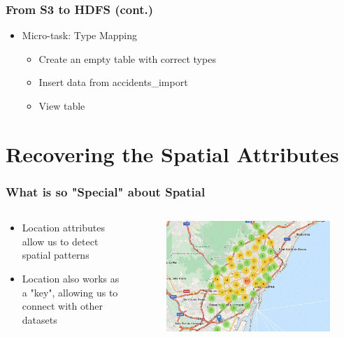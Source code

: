 \documentclass[hyperref={pdfpagelabels=true}]{beamer}
\begin{document}
\begin{frame}
\frametitle{From S3 to HDFS (cont.)}
\begin{itemize}
  \item<1->Micro-task: Type Mapping
  \begin{itemize}
    \item<2->Create an empty table with correct types
    \item<3->Insert data from accidents\_import
    \item<4->View table
  \end{itemize}
\end{itemize}
\end{frame}

\section{Recovering the Spatial Attributes} 

\begin{frame}
\frametitle{What is so "Special" about Spatial}
\begin{columns}
  \begin{column}{0.5\textwidth}
    \begin{itemize}
      \item<2-> Location attributes allow us to detect spatial patterns
      \item<2-> Location also works as a "key", allowing us to connect with other datasets
    \end{itemize}    
  \end{column}
  
  \begin{column}{0.5\textwidth}
      \begin{figure}  
	\includegraphics[width=\textwidth]{bettermap.png}\\
       \end{figure}  
  \end{column}  
\end{columns}
\end{frame}
\end{document}
